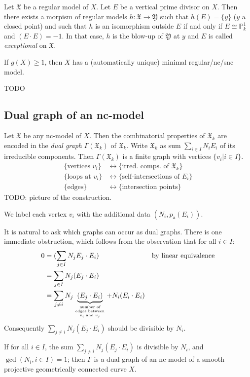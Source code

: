 \begin{theorem}
	Let $\mathfrak{X}$ be a regular model of $X$. Let $E$ be a vertical
	prime divisor on $X$. Then there exists a morpism of regular models $h
	\colon \mathfrak{X} \to \mathfrak{Y}$ such that $h(E) = \{y\}$ ($y$ a
	closed point) and such that $h$ is an isomorphism outside $E$ if and
	only if $E \cong \mathbb{P}^{1}_{k}$ and $(E \cdot E) = -1$. In that
	case, $h$ is the blow-up of $\mathfrak{Y}$ at $y$ and $E$ is called
	\emph{exceptional} on $\mathfrak{X}$.
\end{theorem}

\begin{exercise}
	If $g(X) \ge 1$, then $X$ has a (automatically unique) minimal
	regular/nc/snc model.
	\begin{solution}
		TODO
	\end{solution}
\end{exercise}

\subsection{Dual graph of an nc-model}

Let $\mathfrak{X}$ be any nc-model of $X$. Then the combinatorial properties of
$\mathfrak{X}_{k}$ are encoded in the \emph{dual graph}
$\Gamma(\mathfrak{X}_{k})$ of $\mathfrak{X}_{k}$. Write $\mathfrak{X}_{k}$ as
sum $\sum_{i \in I}N_{i}E_{i}$ of its irreducible components. Then
$\Gamma(\mathfrak{X}_{k})$ is a finite graph with vertices $\{ v_{i} | i \in I
\}$.
\begin{align*}
	\{\text{vertices } v_{i}\} &\longleftrightarrow \{ \text{irred. comps. of $\mathfrak{X}_{k}$} \} \\
	\{\text{loops at } v_{i}\} &\longleftrightarrow \{ \text{self-intersections of $E_{i}$} \} \\
	\{\text{edges} \} &\longleftrightarrow \{ \text{intersection points} \}
\end{align*}
TODO: picture of the construction.

We label each vertex $v_{i}$ with the additional data $(N_{i}, p_{\textrm{a}}(E_{i}))$.

It is natural to ask which graphs can occur as dual graphs. There is one
immediate obstruction, which follows from the observation that for all $i \in
I$:
\begin{align*}
	0 &= (\sum_{j \in I} N_{j}E_{j} \cdot E_{i}) &&\text{by linear equivalence} \\
	&= \sum_{j \in I} N_{j} (E_{j} \cdot E_{i}) \\
	&= \sum_{j \ne i} N_{j} \underbrace{(E_{j} \cdot E_{i})}_{\parbox{4.5em}{\tiny \centering number of edges between $v_{i}$ and $v_{j}$}} + N_{i}(E_{i} \cdot E_{i})
\end{align*}
Consequently $\sum_{j \ne i} N_{j} (E_{j} \cdot E_{i})$ should be divisible by $N_{i}$.
\begin{theorem}[Winters]
	If for all $i \in I$, the sum $\sum_{j \ne i} N_{j} (E_{j} \cdot E_{i})$ is divisible by $N_{i}$, and $\gcd(N_{i}, i \in I) = 1$; then $\Gamma$ is a dual graph of an nc-model of a smooth projective geometrically connected curve $X$.
\end{theorem}

